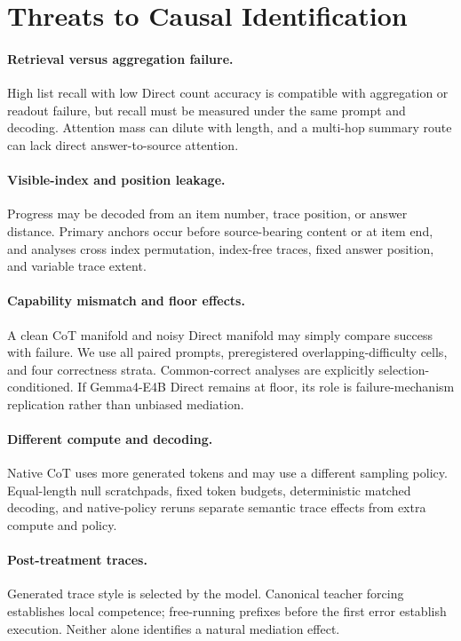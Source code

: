 \section{Threats to Causal Identification}

\paragraph{Retrieval versus aggregation failure.}
High list recall with low Direct count accuracy is compatible with aggregation or readout failure, but recall must be measured under the same prompt and decoding. Attention mass can dilute with length, and a multi-hop summary route can lack direct answer-to-source attention.

\paragraph{Visible-index and position leakage.}
Progress may be decoded from an item number, trace position, or answer distance. Primary anchors occur before source-bearing content or at item end, and analyses cross index permutation, index-free traces, fixed answer position, and variable trace extent.

\paragraph{Capability mismatch and floor effects.}
A clean CoT manifold and noisy Direct manifold may simply compare success with failure. We use all paired prompts, preregistered overlapping-difficulty cells, and four correctness strata. Common-correct analyses are explicitly selection-conditioned. If Gemma4-E4B Direct remains at floor, its role is failure-mechanism replication rather than unbiased mediation.

\paragraph{Different compute and decoding.}
Native CoT uses more generated tokens and may use a different sampling policy. Equal-length null scratchpads, fixed token budgets, deterministic matched decoding, and native-policy reruns separate semantic trace effects from extra compute and policy.

\paragraph{Post-treatment traces.}
Generated trace style is selected by the model. Canonical teacher forcing establishes local competence; free-running prefixes before the first error establish execution. Neither alone identifies a natural mediation effect.

